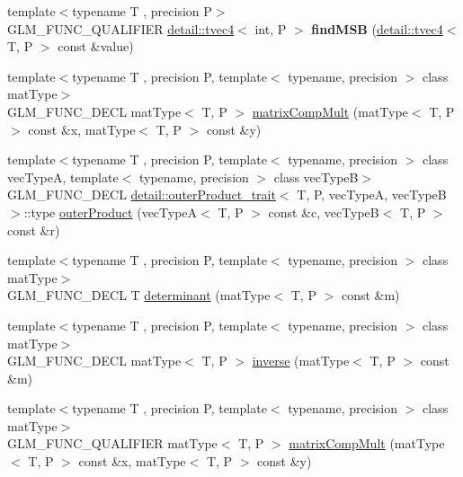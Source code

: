\begin{DoxyCompactItemize}
\item 
{\footnotesize template$<$typename T , precision P$>$ }\\G\+L\+M\+\_\+\+F\+U\+N\+C\+\_\+\+Q\+U\+A\+L\+I\+F\+I\+ER \hyperlink{structglm_1_1detail_1_1tvec4}{detail\+::tvec4}$<$ int, P $>$ {\bfseries find\+M\+SB} (\hyperlink{structglm_1_1detail_1_1tvec4}{detail\+::tvec4}$<$ T, P $>$ const \&value)\hypertarget{namespaceglm_a91e6dfc9a29f78870ea1e8918dd90072}{}\label{namespaceglm_a91e6dfc9a29f78870ea1e8918dd90072}

\item 
{\footnotesize template$<$typename T , precision P, template$<$ typename, precision $>$ class mat\+Type$>$ }\\G\+L\+M\+\_\+\+F\+U\+N\+C\+\_\+\+D\+E\+CL mat\+Type$<$ T, P $>$ \hyperlink{group__core__func__matrix_ga4a54992e4741188ee624b21e3ba91814}{matrix\+Comp\+Mult} (mat\+Type$<$ T, P $>$ const \&x, mat\+Type$<$ T, P $>$ const \&y)
\item 
{\footnotesize template$<$typename T , precision P, template$<$ typename, precision $>$ class vec\+TypeA, template$<$ typename, precision $>$ class vec\+TypeB$>$ }\\G\+L\+M\+\_\+\+F\+U\+N\+C\+\_\+\+D\+E\+CL \hyperlink{structglm_1_1detail_1_1outer_product__trait}{detail\+::outer\+Product\+\_\+trait}$<$ T, P, vec\+TypeA, vec\+TypeB $>$\+::type \hyperlink{group__core__func__matrix_gae9f513dc8e4f3ceb993669321b6d0f09}{outer\+Product} (vec\+TypeA$<$ T, P $>$ const \&c, vec\+TypeB$<$ T, P $>$ const \&r)
\item 
{\footnotesize template$<$typename T , precision P, template$<$ typename, precision $>$ class mat\+Type$>$ }\\G\+L\+M\+\_\+\+F\+U\+N\+C\+\_\+\+D\+E\+CL T \hyperlink{group__core__func__matrix_ga26ea77c574802bc6fc193c40478718d2}{determinant} (mat\+Type$<$ T, P $>$ const \&m)
\item 
{\footnotesize template$<$typename T , precision P, template$<$ typename, precision $>$ class mat\+Type$>$ }\\G\+L\+M\+\_\+\+F\+U\+N\+C\+\_\+\+D\+E\+CL mat\+Type$<$ T, P $>$ \hyperlink{group__core__func__matrix_ga7635d3dbe5aa10ff73a0e6903bf6bea5}{inverse} (mat\+Type$<$ T, P $>$ const \&m)
\item 
{\footnotesize template$<$typename T , precision P, template$<$ typename, precision $>$ class mat\+Type$>$ }\\G\+L\+M\+\_\+\+F\+U\+N\+C\+\_\+\+Q\+U\+A\+L\+I\+F\+I\+ER mat\+Type$<$ T, P $>$ \hyperlink{group__core__func__matrix_ga4a54992e4741188ee624b21e3ba91814}{matrix\+Comp\+Mult} (mat\+Type$<$ T, P $>$ const \&x, mat\+Type$<$ T, P $>$ const \&y)

\end{DoxyCompactItemize}
